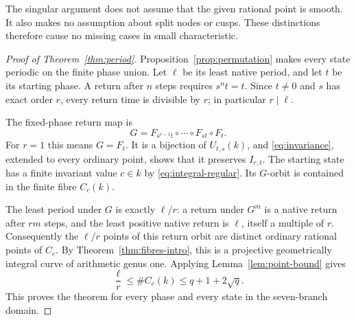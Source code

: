 The singular argument does not assume that the given rational point
is smooth. It also makes no assumption about split nodes or cusps.
These distinctions therefore cause no missing cases in small
characteristic.

\begin{proof}[Proof of Theorem~\ref{thm:period}]
Proposition~\ref{prop:permutation} makes every state periodic on
the finite phase union. Let \(\ell\) be its least native period,
and let \(t\) be its starting phase. A return after \(n\) steps
requires \(s^nt=t\). Since \(t\ne0\) and \(s\) has exact
order \(r\), every return time is divisible by \(r\); in
particular \(r\mid\ell\).

The fixed-phase return map is
\[
G=F_{s^{r-1}t}\circ\cdots\circ F_{st}\circ F_t.
\]
For \(r=1\) this means \(G=F_t\). It is a bijection of
\(U_{t,s}(k)\), and \eqref{eq:invariance}, extended to every
ordinary point, shows that it preserves \(I_{r,t}\).
The starting state has a finite invariant value \(c\in k\) by
\eqref{eq:integral-regular}. Its \(G\)-orbit is contained in the
finite fibre \(C_c(k)\).

The least period under \(G\) is exactly \(\ell/r\): a return
under \(G^m\) is a native return after \(rm\) steps, and the
least positive native return is \(\ell\), itself a multiple of
\(r\). Consequently the \(\ell/r\) points of this return
orbit are distinct ordinary rational points of \(C_c\).
By Theorem~\ref{thm:fibres-intro}, this is a projective
geometrically integral curve of arithmetic genus one. Applying
Lemma~\ref{lem:point-bound} gives
\[
\frac{\ell}{r}\le\#C_c(k)\le q+1+2\sqrt q.
\]
This proves the theorem for every phase and every state in the
seven-branch domain.
\end{proof}
